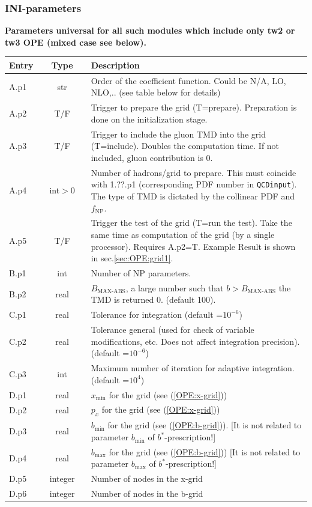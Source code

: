 \documentclass[prd,nofootinbib,eqsecnum,final]{revtex4}
\renewcommand{\(}{\left(}
\renewcommand{\)}{\right)}
\renewcommand{\[}{\left[}
\renewcommand{\]}{\right]}
\begin{document}
\subsubsection{INI-parameters}

\begin{center}
\textbf{Parameters universal for all such modules which include only tw2 or tw3 OPE (mixed case see below).} 
\\
\begin{tabular}{||p{1.5cm}||c||p{12.5cm}||}
\hline\hline
Entry &~~Type~~& Description
\\\hline
A.p1 & str & Order of the coefficient function. Could be N/A, LO, NLO,.. (see table below for details)
\\\hline
A.p2 & T/F & Trigger to prepare the grid (T=prepare). Preparation is done on the initialization stage.
\\\hline
A.p3 & T/F & Trigger to include the gluon TMD into the grid (T=include). Doubles the computation time. If not included, gluon contribution is $0$.
\\\hline
A.p4 & int$>$0 & Number of hadrons/grid to prepare. This must coincide with 1.??.p1 (corresponding PDF number in \texttt{QCDinput}). The type of TMD is dictated by the collinear PDF and $f_{\text{NP}}$.
\\\hline
A.p5 & T/F & Trigger the test of the grid (T=run the test). Take the same time as computation of the grid (by a single processor). Requires A.p2=T. Example Result is shown in sec.\ref{sec:OPE:grid1}. 
\\\hline\hline
B.p1 & int & Number of NP parameters.
\\\hline
B.p2 & real & $B_{\text{MAX-ABS}}$, a large number such that $b>B_{\text{MAX-ABS}}$ the TMD is returned 0. (default 100).
\\\hline\hline
C.p1 & real & Tolerance for integration (default =$10^{-6}$)
\\\hline
C.p2 & real & Tolerance general (used for check of variable modifications, etc. Does not affect integration precision). (default =$10^{-6}$)
\\\hline
C.p3 & int & Maximum number of iteration for adaptive integration. (default =$10^{4}$)
\\\hline\hline
D.p1 & real & $x_{\text{min}}$ for the grid (see (\ref{OPE:x-grid}))
\\\hline
D.p2 & real & $p_x$ for the grid (see (\ref{OPE:x-grid}))
\\\hline
D.p3 & real & $b_{\text{min}}$ for the grid (see (\ref{OPE:b-grid})). [It is not related to parameter $b_{\min}$ of $b^*$-prescription!]
\\\hline
D.p4 & real & $b_{\max}$ for the grid (see (\ref{OPE:b-grid})) [It is not related to parameter $b_{\max}$ of $b^*$-prescription!]
\\\hline
D.p5 & integer & Number of nodes in the x-grid
\\\hline
D.p6 & integer & Number of nodes in the b-grid
\\
\hline\hline
\end{tabular}
\end{center}
\end{document}

